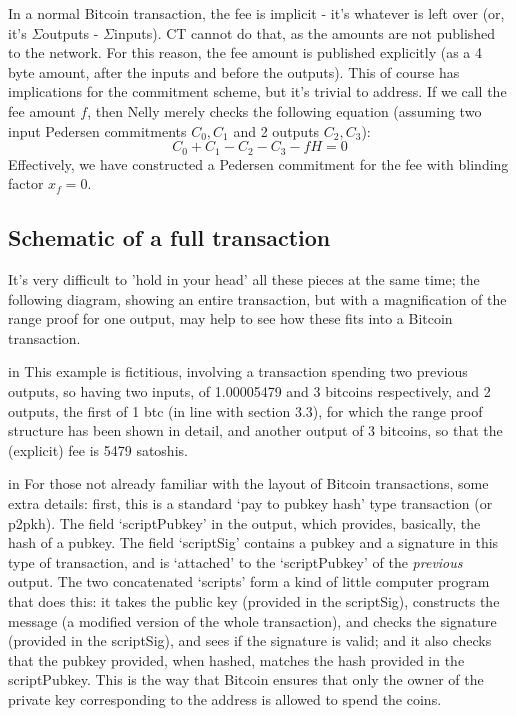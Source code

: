 \documentclass[10pt,a4paper]{article}
\begin{document}
In a normal Bitcoin transaction, the fee is implicit - it's whatever is left over (or, it's $\Sigma$outputs - $\Sigma$inputs). CT cannot do that, as the amounts are not published to the network. For this reason, the fee amount is published explicitly (as a 4 byte amount, after the inputs and before the outputs). This of course has implications for the commitment scheme, but it's trivial to address. If we call the fee amount $f$, then Nelly merely checks the following equation (assuming two input Pedersen commitments $C_0 , C_1$ and 2 outputs $C_2 , C_3$):
\[C_0 + C_1 -C_2 - C_3 - fH = 0\]
Effectively, we have constructed a Pedersen commitment for the fee with blinding factor $x_f=0$.

\subsection{Schematic of a full transaction}

It's very difficult to 'hold in your head' all these pieces at the same time; the following diagram, showing an entire transaction, but with a magnification of the range proof for one output, may help to see how these fits into a Bitcoin transaction.

 in \noindent This example is fictitious, involving a transaction spending two previous outputs, so having two inputs, of 1.00005479 and 3 bitcoins respectively, and 2 outputs, the first of 1 btc (in line with section 3.3), for which the range proof structure has been shown in detail, and another output of 3 bitcoins, so that the (explicit) fee is 5479 satoshis.

 in \noindent For those not already familiar with the layout of Bitcoin transactions, some extra details: first, this is a standard `pay to pubkey hash' type transaction (or p2pkh). The field `scriptPubkey' in the output, which provides, basically, the hash of a pubkey. The field `scriptSig' contains a pubkey and a signature in this type of transaction, and is `attached' to the `scriptPubkey' of the \emph{previous} output. The two concatenated `scripts' form a kind of little computer program that does this: it takes the public key (provided in the scriptSig), constructs the message (a modified version of the whole transaction), and checks the signature (provided in the scriptSig), and sees if the signature is valid; and it also checks that the pubkey provided, when hashed, matches the hash provided in the scriptPubkey. This is the way that Bitcoin ensures that only the owner of the private key corresponding to the address is allowed to spend the coins.
\end{document}
